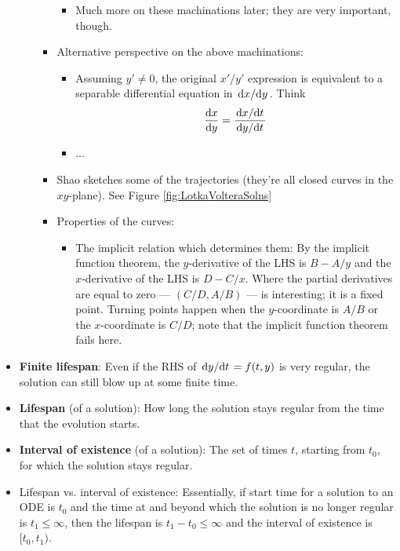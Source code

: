 \documentclass[../notes.tex]{subfiles}
\begin{document}
\begin{itemize}
\begin{enumerate}
\begin{itemize}
\begin{itemize}
                \item Much more on these machinations later; they are very important, though.
            \end{itemize}
            \item Alternative perspective on the above machinations:
            \begin{itemize}
                \item Assuming $y'\neq 0$, the original $x'/y'$ expression is equivalent to a separable differential equation in $\dv*{x}{y}$. Think
                \begin{equation*}
                    \dv{x}{y} = \frac{\dv*{x}{t}}{\dv*{y}{t}}
                \end{equation*}
                \item ...
            \end{itemize}
            \item Shao sketches some of the trajectories (they're all closed curves in the $xy$-plane). See Figure \ref{fig:LotkaVolteraSolns}
            \item Properties of the curves:
            \begin{itemize}
                \item The implicit relation which determines them: By the implicit function theorem, the $y$-derivative of the LHS is $B-A/y$ and the $x$-derivative of the LHS is $D-C/x$. Where the partial derivatives are equal to zero --- $(C/D,A/B)$ --- is interesting; it is a fixed point. Turning points happen when the $y$-coordinate is $A/B$ or the $x$-coordinate is $C/D$; note that the implicit function theorem fails here.
            \end{itemize}
        \end{itemize}
    \end{enumerate}
    \item \textbf{Finite lifespan}: Even if the RHS of $\dv*{y}{t}=f(t,y)$ is very regular, the solution can still blow up at some finite time.
    \item \textbf{Lifespan} (of a solution): How long the solution stays regular from the time that the evolution starts.
    \item \textbf{Interval of existence} (of a solution): The set of times $t$, starting from $t_0$, for which the solution stays regular.
    \item Lifespan vs. interval of existence: Essentially, if start time for a solution to an ODE is $t_0$ and the time at and beyond which the solution is no longer regular is $t_1\leq\infty$, then the lifespan is $t_1-t_0\leq\infty$ and the interval of existence is $[t_0,t_1)$.

\end{itemize}
\end{document}
